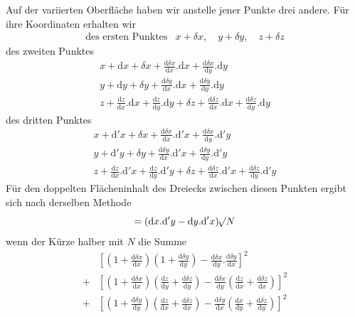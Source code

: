 Auf der variierten Oberfläche haben wir anstelle jener Punkte drei andere. Für ihre Koordinaten erhalten wir
\[
\begin{array}{ll}
\text{des ersten Punktes}&x+\delta x,\quad y+\delta y,\quad z+\delta z
\end{array}
\]
des zweiten Punktes
\[
\begin{gathered}
x+\mathrm{d}x+\delta x+\frac{\mathrm{d}\delta x}{\mathrm{d}x}.\mathrm{d}x+\frac{\mathrm{d}\delta x}{\mathrm{d}y}.\mathrm{d}y\\
y+\mathrm{d}y+\delta y+\frac{\mathrm{d}\delta y}{\mathrm{d}x}.\mathrm{d}x+\frac{\mathrm{d}\delta y}{\mathrm{d}y}.\mathrm{d}y\\
z+\frac{\mathrm{d}z}{\mathrm{d}x}.\mathrm{d}x+\frac{\mathrm{d}z}{\mathrm{d}y}.\mathrm{d}y+\delta z+\frac{\mathrm{d}\delta z}{\mathrm{d}x}.\mathrm{d}x+\frac{\mathrm{d}\delta z}{\mathrm{d}y}.\mathrm{d}y
\end{gathered}
\]
des dritten Punktes
\[
\begin{gathered}
x+\mathrm{d}'x+\delta x+\frac{\mathrm{d}\delta x}{\mathrm{d}x}.\mathrm{d}'x+\frac{\mathrm{d}\delta x}{\mathrm{d}y}.\mathrm{d}'y\\
y+\mathrm{d}'y+\delta y+\frac{\mathrm{d}\delta y}{\mathrm{d}x}.\mathrm{d}'x+\frac{\mathrm{d}\delta y}{\mathrm{d}y}.\mathrm{d}'y\\
z+\frac{\mathrm{d}z}{\mathrm{d}x}.\mathrm{d}'x+\frac{\mathrm{d}z}{\mathrm{d}y}.\mathrm{d}'y+\delta z+\frac{\mathrm{d}\delta z}{\mathrm{d}x}.\mathrm{d}'x+\frac{\mathrm{d}\delta z}{\mathrm{d}y}.\mathrm{d}'y
\end{gathered}
\]
Für den doppelten Flächeninhalt des Dreiecks zwischen diesen Punkten ergibt sich nach derselben Methode
\[
=(\mathrm{d}x.\mathrm{d}'y-\mathrm{d}y.\mathrm{d}'x)\mathord{{}^{}\!\surd}N
\]
wenn der Kürze halber mit $N$ die Summe
\[
\begin{aligned}
&[(1+\frac{\mathrm{d}\delta x}{\mathrm{d}x})(1+\frac{\mathrm{d}\delta y}{\mathrm{d}y})-\frac{\mathrm{d}\delta x}{\mathrm{d}y}.\frac{\mathrm{d}\delta y}{\mathrm{d}x}]^2\\
+&[(1+\frac{\mathrm{d}\delta x}{\mathrm{d}x})(\frac{\mathrm{d}z}{\mathrm{d}y}+\frac{\mathrm{d}\delta z}{\mathrm{d}y})-\frac{\mathrm{d}\delta x}{\mathrm{d}y}(\frac{\mathrm{d}z}{\mathrm{d}x}+\frac{\mathrm{d}\delta z}{\mathrm{d}x})]^2\\
+&[(1+\frac{\mathrm{d}\delta y}{\mathrm{d}y})(\frac{\mathrm{d}z}{\mathrm{d}x}+\frac{\mathrm{d}\delta z}{\mathrm{d}x})-\frac{\mathrm{d}\delta y}{\mathrm{d}x}(\frac{\mathrm{d}x}{\mathrm{d}y}+\frac{\mathrm{d}\delta z}{\mathrm{d}y})]^2
\end{aligned}
\]
